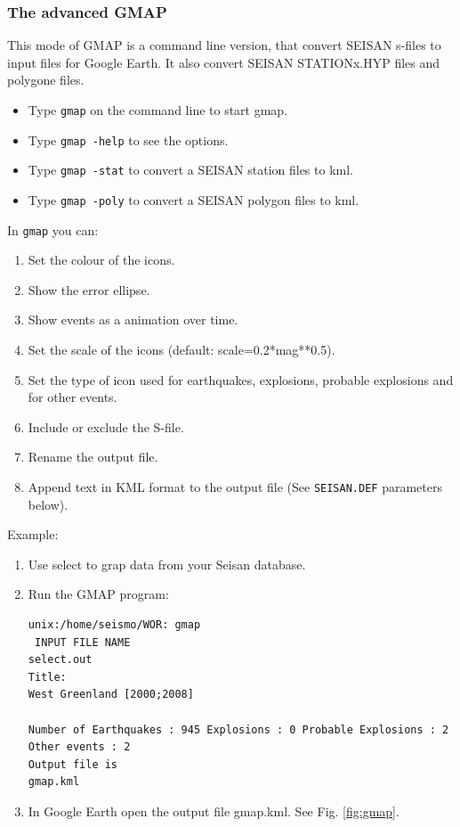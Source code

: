 \subsubsection{The advanced GMAP}
This mode of GMAP is a command line version, that convert SEISAN s-files to input 
files for Google Earth. It also convert SEISAN STATIONx.HYP files and polygone files.

\begin{itemize}
\item
Type \texttt{gmap} on the command line to start gmap.
\item
Type \texttt{gmap -help} to see the options. 
\item
Type \texttt{gmap -stat} to convert a SEISAN station files to kml. 
\item
Type \texttt{gmap -poly} to convert a SEISAN polygon files to kml. 
\end{itemize}

In \texttt{gmap} you can:
\begin{enumerate}
\item 
Set the colour of the icons. 
\item Show the error ellipse.
\item Show events as a animation over time. 
\item Set the scale of the icons (default: scale=0.2*mag**0.5). 
\item Set the type of icon used for earthquakes, explosions, probable explosions and for other events. 
\item Include or exclude the S-file. 
\item Rename the output file. 
\item Append text in KML format to the output file (See \texttt{SEISAN.DEF} parameters below). 
\end{enumerate}


Example: \newline
\begin{enumerate}
\item 
Use select to grap data from your Seisan database. 
\item Run the GMAP program:\newline
\begin{verbatim}
unix:/home/seismo/WOR: gmap 
 INPUT FILE NAME 
select.out 
Title: 
West Greenland [2000;2008]

Number of Earthquakes : 945 Explosions : 0 Probable Explosions : 2 Other events : 2 
Output file is
gmap.kml
\end{verbatim}

\item
In Google Earth open the output file gmap.kml. See Fig. \ref{fig:gmap}. 
\end{enumerate}

